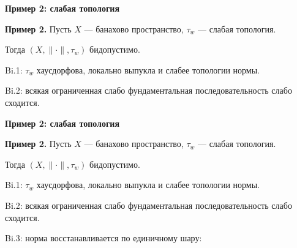 \documentclass[11pt]{article}
\begin{document}
\begin{center}
{\color{notaeYELLOW}\bfseries\fontsize{44}{52}\selectfont Пример 2: слабая топология}
\end{center}
\vspace*{\fill}
\begin{center}
\fontsize{36}{43}\selectfont
\parbox{\linewidth}{\centering\noindent \textbf{Пример 2.} Пусть $X$ --- банахово пространство, $\tau_w$ --- слабая топология.
\par}\vspace{0.4in}
\parbox{\linewidth}{\centering\noindent Тогда $(X,\|\cdot\|,\tau_w)$ бидопустимо.
\par}\vspace{0.4in}
\parbox{\linewidth}{\centering\noindent Bi.1: $\tau_w$ хаусдорфова, локально выпукла и слабее топологии нормы.
\par}\vspace{0.4in}
\parbox{\linewidth}{\centering\noindent Bi.2: всякая ограниченная слабо фундаментальная последовательность слабо сходится.
\par}\vspace{0.4in}
\end{center}
\vspace*{\fill}

\newpage

\begin{center}
{\color{notaeYELLOW}\bfseries\fontsize{44}{52}\selectfont Пример 2: слабая топология}
\end{center}
\vspace*{\fill}
\begin{center}
\fontsize{36}{43}\selectfont
\parbox{\linewidth}{\centering\noindent \textbf{Пример 2.} Пусть $X$ --- банахово пространство, $\tau_w$ --- слабая топология.
\par}\vspace{0.4in}
\parbox{\linewidth}{\centering\noindent Тогда $(X,\|\cdot\|,\tau_w)$ бидопустимо.
\par}\vspace{0.4in}
\parbox{\linewidth}{\centering\noindent Bi.1: $\tau_w$ хаусдорфова, локально выпукла и слабее топологии нормы.
\par}\vspace{0.4in}
\parbox{\linewidth}{\centering\noindent Bi.2: всякая ограниченная слабо фундаментальная последовательность слабо сходится.
\par}\vspace{0.4in}
\parbox{\linewidth}{\centering\noindent Bi.3: норма восстанавливается по единичному шару:
\par}\vspace{0.4in}
\end{center}
\vspace*{\fill}
\end{document}
